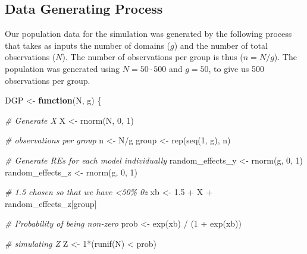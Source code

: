 \documentclass[12pt,twoside]{reedthesis}
\newenvironment{Shaded}{\begin{snugshade}}{\end{snugshade}}
\newcommand{\CommentTok}[1]{\textcolor[rgb]{0.56,0.35,0.01}{\textit{#1}}}
\newcommand{\ControlFlowTok}[1]{\textcolor[rgb]{0.13,0.29,0.53}{\textbf{#1}}}
\newcommand{\DecValTok}[1]{\textcolor[rgb]{0.00,0.00,0.81}{#1}}
\newcommand{\FloatTok}[1]{\textcolor[rgb]{0.00,0.00,0.81}{#1}}
\newcommand{\FunctionTok}[1]{\textcolor[rgb]{0.00,0.00,0.00}{#1}}
\newcommand{\NormalTok}[1]{#1}
\newcommand{\OtherTok}[1]{\textcolor[rgb]{0.56,0.35,0.01}{#1}}
\newcommand{\SpecialCharTok}[1]{\textcolor[rgb]{0.00,0.00,0.00}{#1}}
\begin{document}
\hypertarget{data-generating-process}{%
\subsection{Data Generating Process}\label{data-generating-process}}

Our population data for the simulation was generated by the following process that takes as inputs the number of domains (\(g\)) and the number of total observations (\(N\)). The number of observations per group is thus (\(n = N/g\)). The population was generated using \(N = 50\cdot 500\) and \(g = 50\), to give us 500 observations per group.
\begin{Shaded}
\begin{Highlighting}[]
\NormalTok{DGP }\OtherTok{\textless{}{-}} \ControlFlowTok{function}\NormalTok{(N, g) \{}
  
  \CommentTok{\# Generate X}
\NormalTok{  X }\OtherTok{\textless{}{-}} \FunctionTok{rnorm}\NormalTok{(N, }\DecValTok{0}\NormalTok{, }\DecValTok{1}\NormalTok{)}
  
  \CommentTok{\# observations per group}
\NormalTok{  n }\OtherTok{\textless{}{-}}\NormalTok{ N}\SpecialCharTok{/}\NormalTok{g}
\NormalTok{  group }\OtherTok{\textless{}{-}} \FunctionTok{rep}\NormalTok{(}\FunctionTok{seq}\NormalTok{(}\DecValTok{1}\NormalTok{, g), n) }
    
  \CommentTok{\# Generate REs for each model individually}
\NormalTok{  random\_effects\_y }\OtherTok{\textless{}{-}} \FunctionTok{rnorm}\NormalTok{(g, }\DecValTok{0}\NormalTok{, }\DecValTok{1}\NormalTok{) }
\NormalTok{  random\_effects\_z }\OtherTok{\textless{}{-}} \FunctionTok{rnorm}\NormalTok{(g, }\DecValTok{0}\NormalTok{, }\DecValTok{1}\NormalTok{) }
    
  \CommentTok{\# 1.5 chosen so that we have \textless{}50\% 0\textquotesingle{}z}
\NormalTok{  xb }\OtherTok{\textless{}{-}} \FloatTok{1.5} \SpecialCharTok{+}\NormalTok{ X }\SpecialCharTok{+}\NormalTok{ random\_effects\_z[group]}
  
  \CommentTok{\# Probability of being non{-}zero}
\NormalTok{  prob }\OtherTok{\textless{}{-}} \FunctionTok{exp}\NormalTok{(xb) }\SpecialCharTok{/}\NormalTok{ (}\DecValTok{1} \SpecialCharTok{+} \FunctionTok{exp}\NormalTok{(xb)) }
  
  \CommentTok{\# simulating Z}
\NormalTok{  Z }\OtherTok{\textless{}{-}} \DecValTok{1}\SpecialCharTok{*}\NormalTok{(}\FunctionTok{runif}\NormalTok{(N) }\SpecialCharTok{\textless{}}\NormalTok{ prob) }
    

\end{Highlighting}
\end{Shaded}
\end{document}
